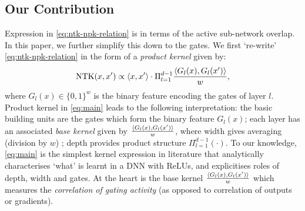 \begin{comment}
\begin{center}
\emph{Duality: DNNs with ReLU are layers as well as paths}
\end{center}
The standard primal way of expressing information processing is layer by layer. In the dual view, the DNN is broken into paths. A path comprises of gates and weights, and a path is `active' or `on' only if all the gates in the path are `on'. The output is the sum of the contribution of the individual paths. 
\begin{center}
\emph{Most information (i.e., features) is in the gates and gates are learnt during training}
\end{center}
The gates are treated as masks and are decoupled from the weights by storing the gates and weights in two separate networks (see \Cref{sec:dgn}). Now, the information in the gates can be measured by fixing the gates and training the weights. It was shown that (i) when the gates from a trained DNN are used as masks, and the weights are trained from scratch, there is no significant loss in test performance, i.e., \textbf{features are stored in the gates} and (ii) gates of a trained network perform better than $\text{NTK}_{\infty}$ and gates from a untrained network performs poorly than $\text{NTK}_{\infty}$, i.e., \textbf{learning in the gates explains the difference between finite vs infinite} width DNNs with ReLUs.
\begin{center}
\emph{NTK is interpretable in terms of active sub-networks}
\end{center}
\end{comment}


\subsection{Our Contribution}
Expression in \eqref{eq:ntk-npk-relation} is in terms of the active sub-network overlap. In this paper, we further simplify this down to the gates. We first `re-write' \eqref{eq:ntk-npk-relation} in the form of a \emph{product kernel} given by:
\begin{align}\label{eq:main}
\text{NTK}(x,x') \propto \langle x,x'\rangle\cdot \Pi_{l=1}^{d-1} \frac{\langle G_l(x),G_l(x')\rangle}w, 
 \end{align}
where $G_l(x)\in\{0,1\}^w$ is the binary feature encoding the gates of layer $l$. Product kernel in \eqref{eq:main} leads to the following interpretation: the basic building units are the gates which form the binary feature $G_l(x)$; each layer has an associated \emph{base kernel} given by $\frac{\langle G_l(x),G_l(x')\rangle}w$, where width gives averaging (division by $w$) ; depth provides product structure $\Pi_{l=1}^{d-1} (\cdot)$. To our knowledge, \eqref{eq:main} is the simplest kernel expression in literature that analytically characterises `what' is learnt in a DNN with ReLUs, and explicitises roles of depth, width and gates. At the heart is the base kernel  $\frac{\langle G_l(x),G_l(x')\rangle}w$ which measures the \emph{correlation of gating activity} (as opposed to correlation of outputs or gradients).

